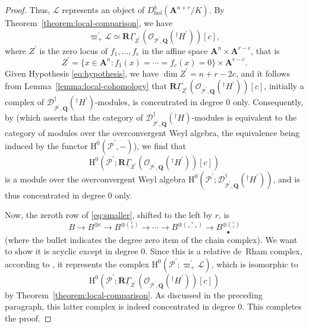 \documentclass[10pt,a4paper]{amsart}
\numberwithin{equation}{section}
\renewcommand{\mathbb}{\mathbf}
\theoremstyle{plain}
\theoremstyle{definition}
\theoremstyle{plain}
\begin{document}
\begin{proof}
Thus, \(\mathcal{L}\) represents an object of
\(D^{b}_{\mathrm{hol}}(\mathbb{A}^{n+r}/K)\). By
Theorem~\ref{theorem:local-comparison}, we have
\begin{equation*}
\varpi^{\prime}_{+} \mathcal{L} \simeq \mathbb{R}\underline{\Gamma}_{Z^{\prime}}(\mathcal{O}_{\mathcal{P}^{\prime}, \mathbb{Q}}({}^{\dagger}H^{\prime}))[c],
\end{equation*}
where \(Z^{\prime}\) is the zero locus of \(f_{1}, \ldots, f_{c}\) in
the affine space \(\mathbb{A}^{n} \times \mathbb{A}^{r-c}\),
that is
\[
Z^{\prime} = \{x \in \mathbb{A}^{n} : f_{1}(x) = \cdots = f_{c}(x) = 0\} \times \mathbb{A}^{r-c}.
\]
Given Hypothesis \eqref{eq:hypothesis}, we have
\(\dim Z^{\prime} = n + r - 2c\), and it follows from
Lemma~\ref{lemma:local-cohomology} that
\(\mathbb{R}\underline{\Gamma}_{Z^{\prime}}(\mathcal{O}_{\mathcal{P}^{\prime}, \mathbb{Q}}({}^{\dagger}H^{\prime}))[c]\),
initially a complex of
\(\mathscr{D}^{\dagger}_{\mathcal{P}^{\prime},\mathbb{Q}}({}^{\dagger}H^{\prime})\)-modules,
is concentrated in degree \(0\) only.  Consequently, by
\cite[Theorem~2.3]{baldassarri-berthelot:dwork-cohomology-for-singular-hypersurfaces}
(which asserts that the category of
\(\mathscr{D}^{\dagger}_{\mathcal{P}^{\prime},\mathbb{Q}}({}^{\dagger}H)\)-modules
is equivalent to the category of modules over the overconvergent Weyl
algebra, the equivalence being induced by the functor
\(\mathrm{H}^{0}(\mathcal{P}^{\prime},-)\)), we find that
\[
\mathrm{H}^{0}(\mathcal{P}^{\prime}; \mathbb{R}\underline{\Gamma}_{Z^{\prime}}(\mathcal{O}_{\mathcal{P}^{\prime}, \mathbb{Q}}({}^{\dagger}H^{\prime}))[c])
\]
is a module over the overconvergent Weyl algebra
\(\mathrm{H}^{0}(\mathcal{P}^{\prime};\mathscr{D}^{\dagger}_{\mathcal{P}^{\prime},\mathbb{Q}}({}^{\dagger}H^{\prime}))\),
and is thus concentrated in degree \(0\) only.

\medskip%
Now, the zeroth row of \eqref{eq:smaller}, shifted to the left by \(r\), is
\[
{B} \to B^{\oplus c} \to B^{\oplus \binom{c}{2}} \to \cdots \to B^{\oplus \binom{c}{c-1}} \to \underset{\bullet}{B^{\oplus \binom{c}{c}}}
\]
(where the bullet indicates the degree zero item of the chain
complex).  We want to show it is acyclic except in degree \(0\).  Since this is
a relative de~Rham complex,  according to
\cite[p.~197, Remark]{baldassarri-berthelot:dwork-cohomology-for-singular-hypersurfaces},
it represents the complex
\(\mathrm{H}^{0}(\mathcal{P}^{\prime}; \varpi^{\prime}_{+}\mathcal{L})\),
which is isomorphic to
\[
\mathrm{H}^{0}(\mathcal{P}^{\prime}; \mathbb{R} \underline{\Gamma}_{Z^{\prime}} (\mathcal{O}_{\mathcal{P}^{\prime}, \mathbb{Q}} ({}^{\dagger} H^{\prime})) [c])
\]
by Theorem~\ref{theorem:local-comparison}.  As discussed in the
preceding paragraph, this latter complex is indeed concentrated in
degree \(0\).  This completes the proof.
\end{proof}
\end{document}
